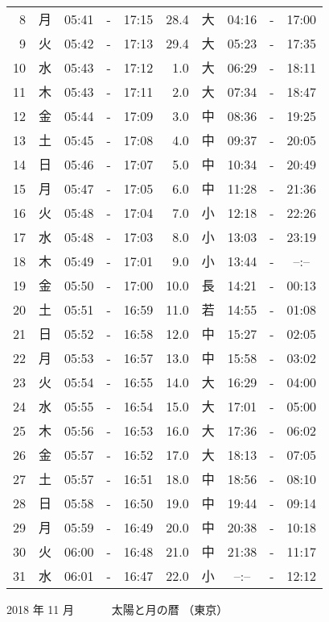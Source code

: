 \documentclass[a4j,10pt]{jsarticle}
\begin{document}
\begin{center}
\begin{table}[ht]
\begin{center}
\begin{tabular}{|rc|ccc|rc|ccc|}
  8 & 月 & 05:41 &-& 17:15 & 28.4 & 大 & 04:16 &-& 17:00 \\
  9 & 火 & 05:42 &-& 17:13 & 29.4 & 大 & 05:23 &-& 17:35 \\
 10 & 水 & 05:43 &-& 17:12 &  1.0 & 大 & 06:29 &-& 18:11 \\
 11 & 木 & 05:43 &-& 17:11 &  2.0 & 大 & 07:34 &-& 18:47 \\
 12 & 金 & 05:44 &-& 17:09 &  3.0 & 中 & 08:36 &-& 19:25 \\
 13 & 土 & 05:45 &-& 17:08 &  4.0 & 中 & 09:37 &-& 20:05 \\
 14 & 日 & 05:46 &-& 17:07 &  5.0 & 中 & 10:34 &-& 20:49 \\
 15 & 月 & 05:47 &-& 17:05 &  6.0 & 中 & 11:28 &-& 21:36 \\
 16 & 火 & 05:48 &-& 17:04 &  7.0 & 小 & 12:18 &-& 22:26 \\
 17 & 水 & 05:48 &-& 17:03 &  8.0 & 小 & 13:03 &-& 23:19 \\
 18 & 木 & 05:49 &-& 17:01 &  9.0 & 小 & 13:44 &-& --:-- \\
 19 & 金 & 05:50 &-& 17:00 & 10.0 & 長 & 14:21 &-& 00:13 \\
 20 & 土 & 05:51 &-& 16:59 & 11.0 & 若 & 14:55 &-& 01:08 \\
 21 & 日 & 05:52 &-& 16:58 & 12.0 & 中 & 15:27 &-& 02:05 \\
 22 & 月 & 05:53 &-& 16:57 & 13.0 & 中 & 15:58 &-& 03:02 \\
 23 & 火 & 05:54 &-& 16:55 & 14.0 & 大 & 16:29 &-& 04:00 \\
 24 & 水 & 05:55 &-& 16:54 & 15.0 & 大 & 17:01 &-& 05:00 \\
 25 & 木 & 05:56 &-& 16:53 & 16.0 & 大 & 17:36 &-& 06:02 \\
 26 & 金 & 05:57 &-& 16:52 & 17.0 & 大 & 18:13 &-& 07:05 \\
 27 & 土 & 05:57 &-& 16:51 & 18.0 & 中 & 18:56 &-& 08:10 \\
 28 & 日 & 05:58 &-& 16:50 & 19.0 & 中 & 19:44 &-& 09:14 \\
 29 & 月 & 05:59 &-& 16:49 & 20.0 & 中 & 20:38 &-& 10:18 \\
 30 & 火 & 06:00 &-& 16:48 & 21.0 & 中 & 21:38 &-& 11:17 \\
 31 & 水 & 06:01 &-& 16:47 & 22.0 & 小 & --:-- &-& 12:12 \\
\hline
\end{tabular}
\end{center}
\end{table}
\newpage
{\large 2018 年 11 月}
{\Large 　　　太陽と月の暦   （東京） }

\end{center}
\end{document}
